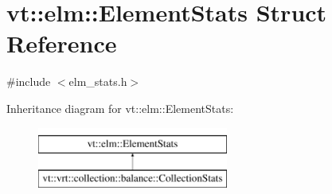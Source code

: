 \hypertarget{structvt_1_1elm_1_1_element_stats}{}\section{vt\+:\+:elm\+:\+:Element\+Stats Struct Reference}
\label{structvt_1_1elm_1_1_element_stats}


{\ttfamily \#include $<$elm\+\_\+stats.\+h$>$}

Inheritance diagram for vt\+:\+:elm\+:\+:Element\+Stats\+:\begin{figure}[H]
\begin{center}
\leavevmode
\includegraphics[height=2.000000cm]{structvt_1_1elm_1_1_element_stats}
\end{center}
\end{figure}
